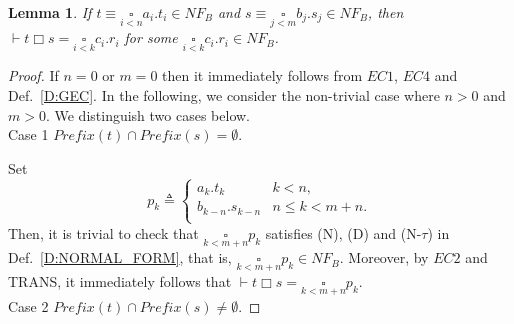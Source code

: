 \documentclass{elsarticle}
\theoremstyle{plain}
\newtheorem{lemma}[theorem]{Lemma}
\theoremstyle{definition}
\begin{document}
\begin{lemma}\label{L:BIG_SQUARE_EC}
  If $t \equiv \underset{i<n}{\square}a_i.t_i \in NF_B$  and $s \equiv \underset{j<m}{\square}b_j.s_j \in NF_B$, then $\vdash t \Box s = \underset{i<k}\square c_i.r_i$ for some $\underset{i<k}\square c_i.r_i \in NF_B$.
\end{lemma}
\begin{proof}
If $n=0$ or $m=0$ then it immediately follows from $EC1$, $EC4$ and Def.~\ref{D:GEC}.
In the following, we consider the non-trivial case where $n>0$ and $m>0$.
We distinguish two cases below.\\

\noindent Case 1 $Prefix(t) \cap Prefix(s)=\emptyset$.

          Set
            \[p_k \triangleq \begin{cases}
                a_k.t_k  & k<n,\\
                b_{k-n}.s_{k-n} &  n \leq k < m+n.\\
                \end{cases}\]
        Then, it is trivial to check that $\underset{k<m+n}\square p_k $ satisfies (N), (D) and (N-$\tau$) in Def.~\ref{D:NORMAL_FORM}, that is, $\underset{k<m+n}\square p_k \in NF_B$.
        Moreover, by $EC2$ and TRANS, it immediately follows that $\vdash t \Box s = \underset{k<m+n}\square p_k$.\\

\noindent Case 2 $Prefix(t) \cap Prefix(s) \neq \emptyset $.


\end{proof}
\end{document}
